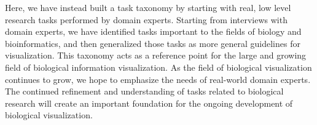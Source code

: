 \documentclass[twocolumn]{bmcart}%
\begin{document}
Here, we have instead built a task taxonomy by starting with real, low level research tasks performed by domain experts.
Starting from interviews with domain experts, we have identified tasks important to the fields of biology and bioinformatics, and then generalized those tasks as more general guidelines for visualization.
This taxonomy acts as a reference point for the large and growing field of biological information visualization.
As the field of biological visualization continues to grow, we hope to emphasize the needs of real-world domain experts.
The continued refinement and understanding of tasks related to biological research will create an important foundation for the ongoing development of biological visualization.

\end{document}
